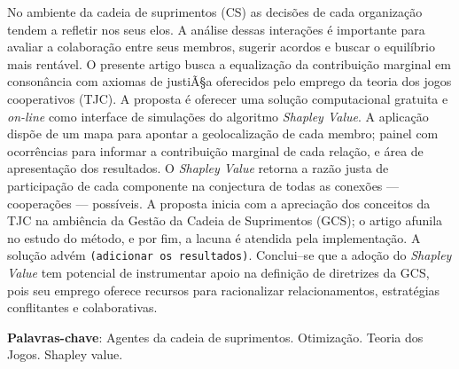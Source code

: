 \documentclass[
	article,			        %
	11pt,				          %
	oneside,			        %
	a4paper,			        %
	english,			        %
	brazil,				        %
	sumario=tradicional
]{abntex2}\usepackage[]{graphicx}\usepackage[]{color}
\author{João B. G. Brito, \emph{Esp.}   \\   
    \href{mailto:jbgb@uol.com.br}{jbgb@uol.com.br} 
  \and {Michel J. Anzanello, \emph{Phd}} \\
    \href{mailto:michel.anzanello@gmail.com}{michel.anzanello@gmail.com}
}
\date{\today}
\begin{document}

\frenchspacing 


%
%
\maketitle


\begin{resumoumacoluna}
No ambiente da cadeia de suprimentos (CS) as decisões de cada organização tendem a refletir nos seus elos. A análise dessas interações é importante para avaliar a colaboração entre seus membros, sugerir acordos e buscar o equilíbrio mais rentável. O presente artigo busca a equalização da contribuição marginal em consonância com axiomas de justiÃ§a oferecidos pelo emprego da teoria dos jogos cooperativos (TJC). A proposta é oferecer uma solução computacional gratuita e \emph{on-line} como interface de simulações do algoritmo \emph{Shapley Value}. A aplicação dispõe de um mapa para apontar a geolocalização de cada membro; painel com ocorrências para informar a contribuição marginal de cada relação, e área de apresentação dos resultados. O \emph{Shapley Value} retorna a razão justa de participação de cada componente na conjectura de todas as conexões --- cooperações --- possíveis. A proposta inicia com a apreciação dos conceitos da TJC na ambiência da Gestão da Cadeia de Suprimentos (GCS); o artigo afunila no estudo do método, e por fim, a lacuna é atendida pela implementação. A solução advém \texttt{(adicionar os resultados)}. Conclui--se que a adoção do \emph{Shapley Value} tem potencial de instrumentar apoio na definição de diretrizes da GCS, pois seu emprego oferece recursos para racionalizar relacionamentos, estratégias conflitantes e colaborativas.

 \vspace{\onelineskip}
 
 \noindent
 \textbf{Palavras-chave}: Agentes da cadeia de suprimentos. Otimização. Teoria dos Jogos. Shapley value.
\end{resumoumacoluna}
\end{document}
